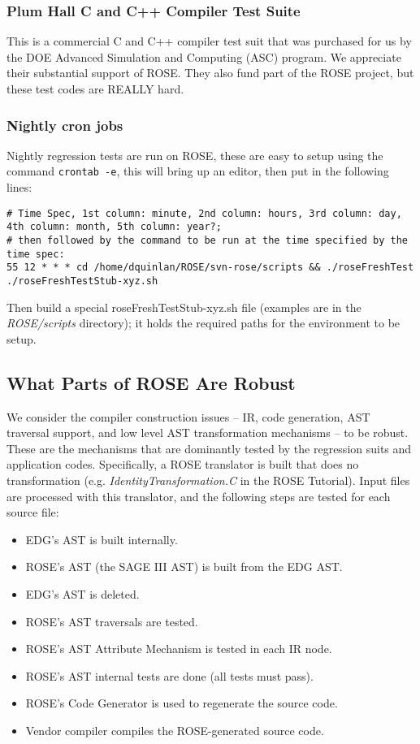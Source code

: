 \subsubsection{Plum Hall C and C++ Compiler Test Suite}
   This is a commercial C and C++ compiler test suit that was purchased
for us by the DOE Advanced Simulation and Computing (ASC) program.  We appreciate their 
substantial support of ROSE. They also fund part of the ROSE project, but these
test codes are REALLY hard.

\subsubsection{Nightly cron jobs}
Nightly regression tests are run on ROSE, these are easy to setup using the command 
{\tt crontab -e}, this will bring up an editor, then put in the following lines: 
\begin{verbatim}
# Time Spec, 1st column: minute, 2nd column: hours, 3rd column: day, 4th column: month, 5th column: year?; 
# then followed by the command to be run at the time specified by the time spec:
55 12 * * * cd /home/dquinlan/ROSE/svn-rose/scripts && ./roseFreshTest ./roseFreshTestStub-xyz.sh 
\end{verbatim}

Then build a special roseFreshTestStub-xyz.sh file (examples are in the {\em ROSE/scripts} 
directory); it holds the required paths for the environment to be setup.


\subsection{What Parts of ROSE Are Robust}
    We consider the compiler construction issues -- IR, code generation, AST 
traversal support, and low level AST transformation mechanisms -- to be robust.  
These are the mechanisms that are dominantly tested by the regression suits 
and application codes.  Specifically, a ROSE translator is built that does no
transformation (e.g. {\em IdentityTransformation.C} in the ROSE Tutorial).
Input files are processed with this translator, and the following steps
are tested for each source file:
\begin{itemize}
   \item EDG's AST is built internally.
   \item ROSE's AST (the SAGE III AST) is built from the EDG AST.
   \item EDG's AST is deleted.
   \item ROSE's AST traversals are tested.
   \item ROSE's AST Attribute Mechanism is tested in each IR node.
   \item ROSE's AST internal tests are done (all tests must pass).
   \item ROSE's Code Generator is used to regenerate the source code.
   \item Vendor compiler compiles the ROSE-generated source code.
\end{itemize}


